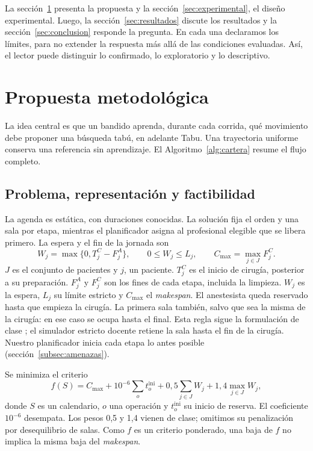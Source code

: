 \documentclass[12pt,letterpaper]{report}
\begin{document}
La sección~\ref{sec:propuesta} presenta la propuesta y la
sección~\ref{sec:experimental}, el diseño experimental. Luego, la
sección~\ref{sec:resultados} discute los resultados y la
sección~\ref{sec:conclusion} responde la pregunta. En cada una declaramos los límites,
para no extender la respuesta más allá de las condiciones evaluadas. Así, el lector puede
distinguir lo confirmado, lo exploratorio y lo descriptivo.\label{int-fin}

\clearpage
\section{Propuesta metodológica}
\label{sec:propuesta}\label{pro-ini}
La idea central es que un bandido aprenda, durante cada corrida, qué movimiento
debe proponer una búsqueda tabú, en adelante Tabu. Una trayectoria uniforme
conserva una referencia sin aprendizaje. El Algoritmo~\ref{alg:cartera} resume
el flujo completo.

\subsection{Problema, representación y factibilidad}
La agenda es estática, con duraciones conocidas. La solución fija el orden y una
sala por etapa, mientras el planificador asigna al profesional elegible que se
libera primero. La espera y el fin de la jornada son
\begin{equation}
 W_j=\max\{0,T_j^C-F_j^A\},\qquad 0\leq W_j\leq L_j,
 \qquad C_{\max}=\max_{j\in J}F_j^C.
 \label{eq:restricciones}
\end{equation}
\noindent $J$ es el conjunto de pacientes y $j$, un paciente. $T_j^C$ es el
inicio de cirugía, posterior a su preparación. $F_j^A$ y $F_j^C$ son los fines de
cada etapa, incluida la limpieza. $W_j$ es la espera, $L_j$ su límite estricto y
$C_{\max}$ el \emph{makespan}. El anestesista queda reservado hasta que empieza la
cirugía. La primera sala también, salvo que sea la misma de la cirugía: en ese
caso se ocupa hasta el final. Esta regla sigue la formulación de clase
\parencite{lara2026}; el simulador estricto docente retiene la sala hasta el fin
de la cirugía. Nuestro planificador inicia cada etapa lo antes posible (sección~\ref{subsec:amenazas}).

Se minimiza el criterio
\begin{equation}
 f(S)=C_{\max}+10^{-6}\sum_o t_o^{\mathrm{ini}}
        +0{,}5\sum_{j\in J}W_j+1{,}4\max_{j\in J}W_j,
 \label{eq:objetivo}
\end{equation}
\noindent donde $S$ es un calendario, $o$ una operación y $t_o^{\mathrm{ini}}$ su
inicio de reserva. El coeficiente $10^{-6}$ desempata. Los pesos 0,5 y 1,4 vienen de clase; omitimos su penalización por
desequilibrio de salas. Como $f$ es un criterio ponderado, una baja de $f$ no
implica la misma baja del \emph{makespan}.
\end{document}
